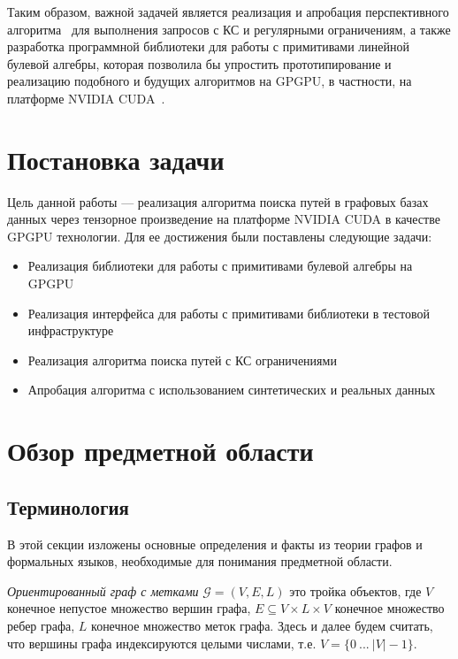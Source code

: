 \documentclass[14pt]{matmex-diploma-custom}
\begin{document}
Таким образом, важной задачей является реализация и апробация перспективного алгоритма~\cite{inbook:kronecker_cfpq_adbis} для выполнения запросов с КС и регулярными ограничениям, а также разработка программной библиотеки для работы с примитивами линейной булевой алгебры, которая позволила бы упростить прототипирование и реализацию подобного и будущих алгоритмов на GPGPU, в частности, на платформе NVIDIA CUDA~\cite{net:cuda_toolkit_docs}.

\section{Постановка задачи}

Цель данной работы --- реализация алгоритма поиска путей в графовых базах данных через тензорное произведение на платформе NVIDIA CUDA в качестве GPGPU технологии. Для ее достижения были поставлены следующие задачи:

\begin{itemize}
    \item Реализация библиотеки для работы с примитивами булевой алгебры на GPGPU
    \item Реализация интерфейса для работы с примитивами библиотеки в тестовой инфраструктуре
    \item Реализация алгоритма поиска путей с КС ограничениями
    \item Апробация алгоритма с использованием синтетических и реальных данных
\end{itemize}

\section{Обзор предметной области}

\subsection{Терминология}

В этой секции изложены основные определения и факты из теории графов и формальных языков, необходимые для понимания предметной области. 
    
\textit{Ориентированный граф с метками} $\mathcal{G} = (V, E, L)$ это тройка объектов, где $V$ конечное непустое множество вершин графа, $E \subseteq V \times L \times V$ конечное множество ребер графа, $L$ конечное множество меток графа. Здесь и далее будем считать, что вершины графа индексируются целыми числами, т.е. $V = \{0~...~|V| - 1\}$.
\end{document}
